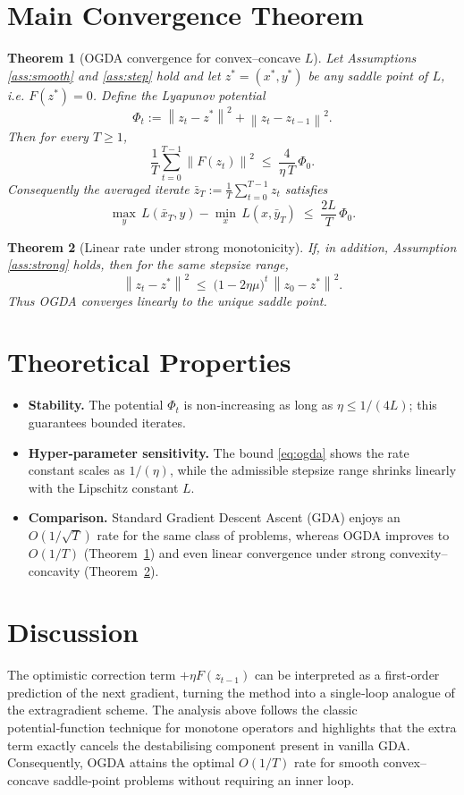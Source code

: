 \documentclass{article}
\newtheorem{theorem}{Theorem}
\newcommand{\norm}[1]{\left\|#1\right\|}
\begin{document}
\section*{Main Convergence Theorem}
\begin{theorem}[OGDA convergence for convex–concave $L$]\label{thm:conv}
Let Assumptions \ref{ass:smooth} and \ref{ass:step} hold and let $z^{*}=(x^{*},y^{*})$ be any saddle point of $L$, i.e. $F(z^{*})=0$.  
Define the Lyapunov potential
\[
\Phi_{t}:=\norm{z_{t}-z^{*}}^{2}+\norm{z_{t}-z_{t-1}}^{2}.
\]
Then for every $T\ge1$,
\[
\frac{1}{T}\sum_{t=0}^{T-1}\norm{F(z_{t})}^{2}
\;\le\;
\frac{4}{\eta\,T}\,\Phi_{0}.
\tag{1}
\]
Consequently the averaged iterate $\bar z_{T}:=\frac{1}{T}\sum_{t=0}^{T-1}z_{t}$ satisfies
\[
\max_{y}\,L(\bar x_{T},y)-\min_{x}\,L(x,\bar y_{T})\;\le\;
\frac{2L}{T}\,\Phi_{0}.
\]
\end{theorem}

\begin{theorem}[Linear rate under strong monotonicity]\label{thm:linear}
If, in addition, Assumption \ref{ass:strong} holds, then for the same stepsize range,
\[
\norm{z_{t}-z^{*}}^{2}\;\le\;\bigl(1-2\eta\mu\bigr)^{t}\,\norm{z_{0}-z^{*}}^{2}.
\tag{2}
\]
Thus OGDA converges linearly to the unique saddle point.
\end{theorem}

\section*{Theoretical Properties}
\begin{itemize}
\item \textbf{Stability.} The potential $\Phi_{t}$ is non‑increasing as long as $\eta\le1/(4L)$; this guarantees bounded iterates.
\item \textbf{Hyper‑parameter sensitivity.} The bound \eqref{eq:ogda} shows the rate constant scales as $1/(\eta)$, while the admissible stepsize range shrinks linearly with the Lipschitz constant $L$.
\item \textbf{Comparison.} Standard Gradient Descent Ascent (GDA) enjoys an $O(1/\sqrt{T})$ rate for the same class of problems, whereas OGDA improves to $O(1/T)$ (Theorem~\ref{thm:conv}) and even linear convergence under strong convexity–concavity (Theorem~\ref{thm:linear}).
\end{itemize}

\section*{Discussion}
The optimistic correction term $+\eta F(z_{t-1})$ can be interpreted as a first‑order prediction of the next gradient, turning the method into a single‑loop analogue of the extragradient scheme.  The analysis above follows the classic potential‑function technique for monotone operators and highlights that the extra term exactly cancels the destabilising component present in vanilla GDA.  Consequently, OGDA attains the optimal $O(1/T)$ rate for smooth convex–concave saddle‑point problems without requiring an inner loop.
\end{document}
